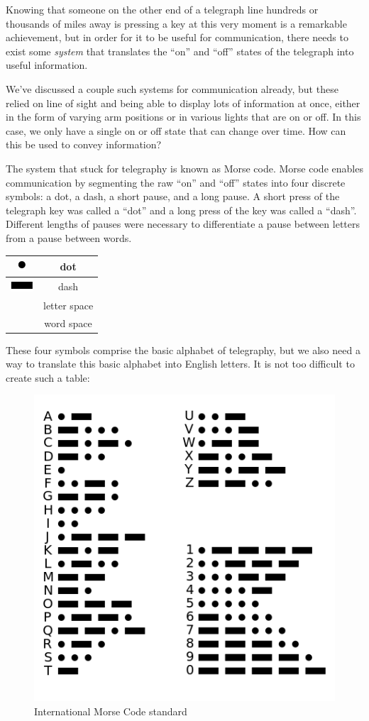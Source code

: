 \documentclass[UTF8]{book}
\newcommand*\thickdash{\includegraphics{thick-dash2}}
\newcommand*\thickdot{\includegraphics{thick-dot2}}
\begin{document}
\begin{CJK}{UTF8}{gbsn}
Knowing that someone on the other end of a telegraph line hundreds or thousands of miles away is pressing a key at this very moment is a remarkable achievement, but in order for it to be useful for communication, there needs to exist some \emph{system} that translates the ``on'' and ``off'' states of the telegraph into useful information.

We've discussed a couple such systems for communication already, but these relied on line of sight and being able to display lots of information at once, either in the form of varying arm positions or in various lights that are on or off. In this case, we only have a single on or off state that can change over time. How can this be used to convey information?

The system that stuck for telegraphy is known as Morse code. Morse code enables communication by segmenting the raw ``on'' and ``off'' states into four discrete symbols: a dot, a dash, a short pause, and a long pause. A short press of the telegraph key was called a ``dot'' and a long press of the key was called a ``dash''. Different lengths of pauses were necessary to differentiate a pause between letters from a pause between words.

\begin{center}
\begin{tabular}{cc}
\thickdot & dot \\
\hline
\thickdash & dash \\
\hline
[short pause] & letter space \\
\hline
[long pause] & word space \\
\end{tabular}
\end{center}

These four symbols comprise the basic alphabet of telegraphy, but we also need a way to translate this basic alphabet into English letters. It is not too difficult to create such a table:

\begin{figure}[H]
\centering
\includegraphics[width=0.8\linewidth]{morse-code}
\caption{International Morse Code standard}
\end{figure}


\end{CJK}
\end{document}
